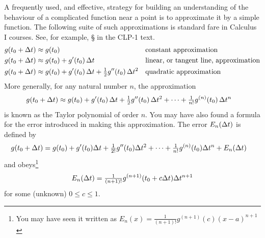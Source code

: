 A frequently used, and effective, strategy for building an understanding
of the behaviour of a complicated function near a point is to
approximate it by a simple function. The following suite of such
approximations is standard fare in Calculus I courses. 
See, for example, \S{} in the CLP-1 text.
\begin{align*}
g(t_0+\Delta t) &\approx g(t_0) 
                   &&\text{constant approximation} \\
g(t_0+\Delta t) &\approx g(t_0) +g'(t_0)\,\Delta t  
                    &&\text{linear, or tangent line, approximation} \\
g(t_0+\Delta t) &\approx g(t_0) +g'(t_0)\,\Delta t +\tfrac{1}{2} g''(t_0)\,\Delta t^2
                    &&\text{quadratic approximation} 
\end{align*}
More generally, for any natural number $n$, the  approximation 
\begin{align*}
g(t_0+\Delta t) &\approx g(t_0) +g'(t_0)\,\Delta t + \tfrac{1}{2} g''(t_0)\,\Delta t^2
                    +\cdots+ \tfrac{1}{n!} g^{(n)}(t_0)\,\Delta t^n
\end{align*}
is known as the Taylor polynomial of order $n$. 
You may have also found a formula for the error introduced in making this 
approximation. The error $E_n(\Delta t)$ is defined by
\begin{align*}
g(t_0+\Delta t)
&=
g(t_0)+g'(t_0)\Delta t+\tfrac{1}{2!}g''(t_0)\Delta t^2
+\cdots
+\tfrac{1}{n!}g^{(n)}(t_0) \Delta t^n +E_n(\Delta t)
\end{align*}
and obeys\footnote{You may have seen it written as 
$E_n(x)=\tfrac{1}{(n+1)!}g^{(n+1)}(c) (x-a)^{n+1}$}
\begin{equation*}
E_n(\Delta t)=
\tfrac{1}{(n+1)!}g^{(n+1)}(t_0+c\Delta t) \Delta t^{n+1}
\end{equation*}
for some (unknown) $0\le c\le 1$. 


